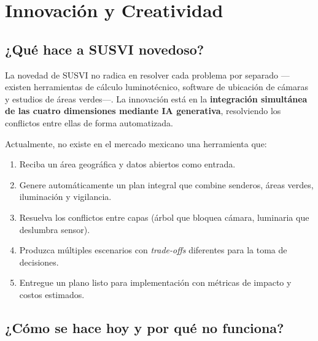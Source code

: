 \documentclass[12pt,a4paper]{article}
\begin{document}
\newpage
\section{Innovación y Creatividad}

\subsection{¿Qué hace a SUSVI novedoso?}

La novedad de SUSVI no radica en resolver cada problema por separado —existen herramientas de cálculo luminotécnico, software de ubicación de cámaras y estudios de áreas verdes—. La innovación está en la \textbf{integración simultánea de las cuatro dimensiones mediante IA generativa}, resolviendo los conflictos entre ellas de forma automatizada.

Actualmente, no existe en el mercado mexicano una herramienta que:

\begin{enumerate}[leftmargin=1.5cm, itemsep=3pt]
  \item Reciba un área geográfica y datos abiertos como entrada.
  \item Genere automáticamente un plan integral que combine senderos, áreas verdes, iluminación y vigilancia.
  \item Resuelva los conflictos entre capas (árbol que bloquea cámara, luminaria que deslumbra sensor).
  \item Produzca múltiples escenarios con \textit{trade-offs} diferentes para la toma de decisiones.
  \item Entregue un plano listo para implementación con métricas de impacto y costos estimados.
\end{enumerate}

\subsection{¿Cómo se hace hoy y por qué no funciona?}
\end{document}
